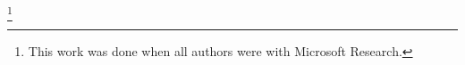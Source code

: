 \documentclass[sigconf,9pt]{acmart}
\numberwithin{equation}{section}
\begin{document}

\thanks{This work was done when all authors were with Microsoft Research.}

\maketitle














{\footnotesize

}

\appendix

\end{document}
